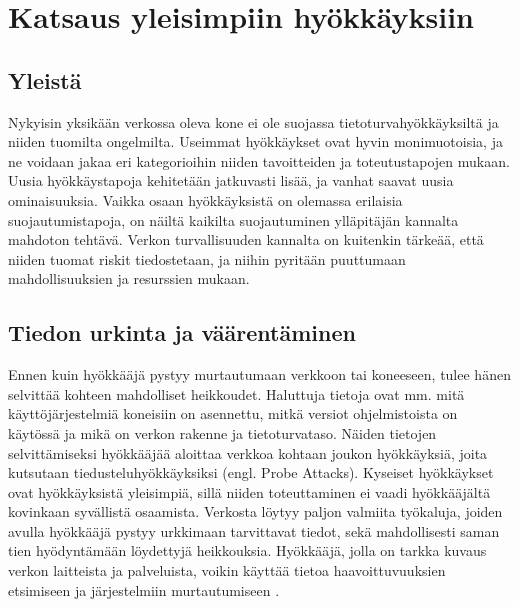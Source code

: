 
\chapter{Katsaus yleisimpiin hyökkäyksiin}

\section{Yleistä}

Nykyisin yksikään verkossa oleva kone ei ole suojassa tietoturvahyökkäyksiltä
ja niiden tuomilta ongelmilta. Useimmat hyökkäykset ovat hyvin monimuotoisia, ja
ne voidaan jakaa eri kategorioihin niiden tavoitteiden ja toteutustapojen
mukaan. Uusia hyökkäystapoja kehitetään jatkuvasti lisää, ja vanhat saavat uusia
ominaisuuksia. Vaikka osaan hyökkäyksistä on olemassa erilaisia suojautumistapoja, 
on näiltä kaikilta suojautuminen ylläpitäjän kannalta mahdoton tehtävä. Verkon
turvallisuuden kannalta on kuitenkin tärkeää, että niiden tuomat riskit
tiedostetaan, ja niihin pyritään puuttumaan  mahdollisuuksien ja resurssien
mukaan.

\section{Tiedon urkinta ja väärentäminen}

Ennen kuin hyökkääjä pystyy murtautumaan verkkoon tai koneeseen, tulee hänen
selvittää kohteen mahdolliset heikkoudet. Haluttuja tietoja ovat mm. mitä
käyttöjärjestelmiä koneisiin on asennettu, mitkä versiot ohjelmistoista on
käytössä ja mikä on verkon rakenne ja tietoturvataso. Näiden tietojen
selvittämiseksi hyökkääjää aloittaa verkkoa kohtaan joukon hyökkäyksiä, joita
kutsutaan tiedusteluhyökkäyksiksi (engl. Probe Attacks). Kyseiset hyökkäykset
ovat hyökkäyksistä yleisimpiä, sillä niiden toteuttaminen ei vaadi hyökkääjältä
kovinkaan syvällistä osaamista. Verkosta löytyy paljon valmiita työkaluja,
joiden avulla hyökkääjä pystyy urkkimaan tarvittavat tiedot, sekä mahdollisesti
saman tien hyödyntämään löydettyjä heikkouksia. Hyökkääjä, jolla on tarkka
kuvaus verkon laitteista ja palveluista, voikin käyttää tietoa
haavoittuvuuksien etsimiseen ja järjestelmiin murtautumiseen \cite{IDS}.

